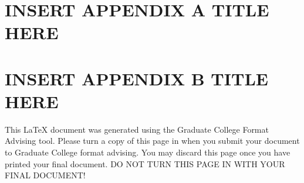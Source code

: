 \documentclass[oneside,11pt]{memoir}
\begin{document}

\appendix
{}
\chapter{\uppercase{Insert Appendix A Title here}}
\clearpage
\chapter{\uppercase{Insert Appendix B Title here}}
\clearpage


This LaTeX document was generated using the Graduate College Format Advising tool. Please turn a copy of this page in when you submit your document to Graduate College format advising. You may discard this page once you have printed your final document. DO NOT TURN THIS PAGE IN WITH YOUR FINAL DOCUMENT!
\end{document}
